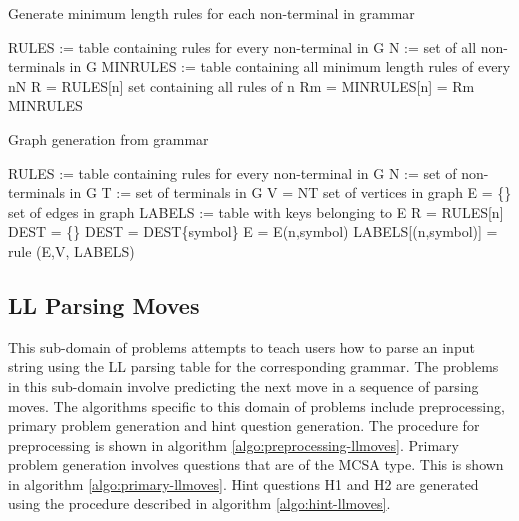 \begin{algorithm}
\caption{Generate minimum length rules for each non-terminal in grammar}
\label{algo:minrule gen}
\begin{algorithmic}[1]
\State RULES := table containing rules for every non-terminal in G
\State N := set of all non-terminals in G
\State MINRULES := table containing all minimum length rules of every n\in N
\State R = RULES[n] \Comment set containing all rules of n
\State Rm = 
\State MINRULES[n] = Rm
\EndFor
\State \Return MINRULES
\EndFunction
\end{algorithmic}
\end{algorithm}

\begin{algorithm}
\caption{Graph generation from grammar}
\label{algo:graph gen}
\begin{algorithmic}[1]
\State RULES := table containing rules for every non-terminal in G
\State N := set of non-terminals in G
\State T := set of terminals in G
\State V = N\cup T \Comment set of vertices in graph
\State E = \{\} \Comment set of edges in graph
\State LABELS := table with keys belonging to E
\State R = RULES[n]
\State DEST = \{\}
\State DEST = DEST\cup \{symbol\}
\State E = E\cup (n,symbol)
\State LABELS[(n,symbol)] = rule
\EndIf
\EndFor
\EndFor
\EndFor
\State \Return (E,V, LABELS)
\EndFunction
\end{algorithmic}
\end{algorithm}


\subsection{LL Parsing Moves}
\label{subsec:llmoves}

This sub-domain of problems attempts to teach users how to parse an input string using the LL parsing table for the corresponding grammar. The problems in this sub-domain involve predicting the next move in a sequence of parsing moves. The algorithms specific to this domain of problems include preprocessing, primary problem generation and hint question generation. The procedure for preprocessing is shown in algorithm \ref{algo:preprocessing-llmoves}. Primary problem generation involves questions that are of the MCSA type. This is shown in algorithm \ref{algo:primary-llmoves}. Hint questions H1 and H2 are generated using the procedure described in algorithm \ref{algo:hint-llmoves}.

